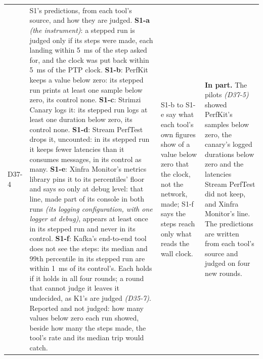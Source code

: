 \documentclass[11pt]{article}
\newcommand{\gl}[1]{{\color{soft}\itshape\small (#1)}}
\begin{document}
{\begin{longtable}{@{}p{1.1cm} >{\raggedright\arraybackslash}p{6.1cm} >{\raggedright\arraybackslash}p{6.0cm} >{\raggedright\arraybackslash}p{2.2cm}@{}}
D37-4 & S1's predictions, from each tool's source, and how they are judged. \textbf{S1-a} \gl{the instrument}: a stepped run is judged only if its steps were made, each landing within 5~ms of the step asked for, and the clock was put back within 5~ms of the PTP clock. \textbf{S1-b}: PerfKit keeps a value below zero: its stepped run prints at least one sample below zero, its control none. \textbf{S1-c}: Strimzi Canary logs it: its stepped run logs at least one duration below zero, its control none. \textbf{S1-d}: Stream PerfTest drops it, uncounted: in its stepped run it keeps fewer latencies than it consumes messages, in its control as many. \textbf{S1-e}: Xinfra Monitor's metrics library pins it to its percentiles' floor and says so only at debug level: that line, made part of its console in both runs \gl{its logging configuration, with one logger at debug}, appears at least once in its stepped run and never in its control. \textbf{S1-f}: Kafka's end-to-end tool does not see the steps: its median and 99th percentile in its stepped run are within 1~ms of its control's. Each holds if it holds in all four rounds; a round that cannot judge it leaves it undecided, as K1's are judged \gl{D35-7}. Reported and not judged: how many values below zero each run showed, beside how many the steps made, the tool's rate and its median trip would catch. & S1-b to S1-e say what each tool's own figures show of a value below zero that the clock, not the network, made; S1-f says the steps reach only what reads the wall clock. & \textbf{In part.} The pilots \gl{D37-5} showed PerfKit's samples below zero, the canary's logged durations below zero and the latencies Stream PerfTest did not keep, and Xinfra Monitor's line. The predictions are written from each tool's source and judged on four new rounds. \\

\end{longtable}}
\end{document}
